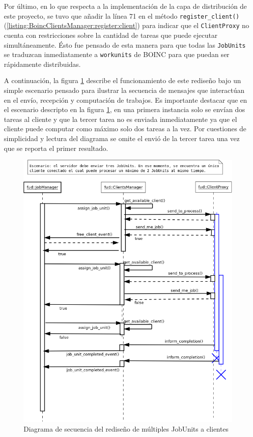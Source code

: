 Por último, en lo que respecta a la implementación de la capa de distribución de este proyecto, se tuvo que añadir la línea 71 en el método \texttt{register\_client()} (\ref{listing:BoincClientsManager:register:client}) para indicar que el \texttt{ClientProxy} no cuenta con restricciones sobre la cantidad de tareas que puede ejecutar simultáneamente. Ésto fue pensado de esta manera para que todas las \texttt{JobUnits} se traduzcan inmediatamente a \texttt{workunits} de BOINC para que puedan ser rápidamente distribuidas.

A continuación, la figura \ref{fig:rediseno:diagram:seq:mult:jobs} describe el funcionamiento de este rediseño bajo un simple escenario pensado para ilustrar la secuencia de mensajes que interactúan en el envío, recepción y computación de trabajos. Es importante destacar que en el escenario descripto en la figura \ref{fig:rediseno:diagram:seq:mult:jobs}, en una primera instancia solo se envían dos tareas al cliente y que la tercer tarea no es enviada inmediatamente ya que el cliente puede computar como máximo solo dos tareas a la vez. Por cuestiones de simplicidad y lectura del diagrama se omite el envió de la tercer tarea una vez que se reporta el primer resultado.

\begin{figure}[H]
	\begin{center}
  		\includegraphics[scale=0.42]{redesing-multiplesJobs-on-client/assign_job_unit_seq_diagram.png}
		\caption{Diagrama de secuencia del rediseño de múltiples JobUnits a clientes}
		\label{fig:rediseno:diagram:seq:mult:jobs}
	\end{center}
\end{figure}


